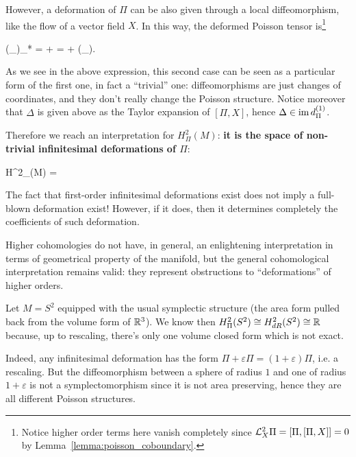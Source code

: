 \documentclass[main.tex]{subfiles}
\begin{document}
However, a deformation of $\Pi$ can be also given through a local diffeomorphism, like the flow of a vector field $X$. In this way, the deformed Poisson tensor is\footnote{Notice higher order terms here vanish completely since $\mathcal{L}_{X}^2\Pi = [\Pi, [\Pi, X]] = 0$ by Lemma~\ref{lemma:poisson_coboundary}.}
\begin{eqalign}
	(\phi_\varepsilon)_* \Pi = \Pi + \varepsilon {}\Pi = \Pi + \varepsilon (_\Delta).
\end{eqalign}
As we see in the above expression, this second case can be seen as a particular form of the first one, in fact a ``trivial'' one: diffeomorphisms are just changes of coordinates, and they don't really change the Poisson structure. Notice moreover that $\Delta$ is given above as the Taylor expansion of $[\Pi, X]$, hence $\Delta \in \operatorname{im} d^{(1)}_\Pi$.

Therefore we reach an interpretation for $H_\Pi^2(M)$: \textbf{it is the space of non-trivial infinitesimal deformations of $\Pi$}:
\begin{eqalign}
	H^2_\Pi(M) = 
\end{eqalign}

\begin{remark}
	The fact that first-order infinitesimal deformations exist does not imply a full-blown deformation exist! However, if it does, then it determines completely the coefficients of such deformation.
\end{remark}

Higher cohomologies do not have, in general, an enlightening interpretation in terms of geometrical property of the manifold, but the general cohomological interpretation remains valid: they represent obstructions to ``deformations'' of higher orders.

\begin{example}
	Let $M=S^2$ equipped with the usual symplectic structure (the area form pulled back from the volume form of $\mathbb{R}^3$). We know then $H^2_\Pi(S^2) \overset{}{\cong} H^2_{dR}(S^2) \overset{}{\cong} \mathbb{R}$ because, up to rescaling, there's only one volume closed form which is not exact.

	Indeed, any infinitesimal deformation has the form $\Pi + \varepsilon \Pi = (1+\varepsilon)\Pi$, i.e. a rescaling. But the diffeomorphism between a sphere of radius $1$ and one of radius $1+\varepsilon$ is not a symplectomorphism since it is not area preserving, hence they are all different Poisson structures.
\end{example}
\end{document}
